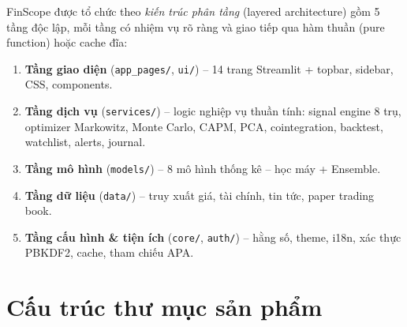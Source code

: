 \documentclass[12pt,a4paper,openany,oneside]{report}
\numberwithin{equation}{chapter}
\begin{document}
\indent FinScope được tổ chức theo \emph{kiến trúc phân tầng} (layered
architecture) gồm 5 tầng độc lập, mỗi tầng có nhiệm vụ rõ ràng và giao
tiếp qua hàm thuần (pure function) hoặc cache đĩa:

\begin{enumerate}[leftmargin=22pt,topsep=2pt,itemsep=4pt]
  \item \textbf{Tầng giao diện} (\texttt{app\_pages/}, \texttt{ui/}) --
   14 trang Streamlit + topbar, sidebar, CSS, components.
  \item \textbf{Tầng dịch vụ} (\texttt{services/}) -- logic nghiệp vụ
   thuần tính: signal engine 8 trụ, optimizer Markowitz, Monte Carlo,
   CAPM, PCA, cointegration, backtest, watchlist, alerts, journal.
  \item \textbf{Tầng mô hình} (\texttt{models/}) -- 8 mô hình thống kê
   -- học máy + Ensemble.
  \item \textbf{Tầng dữ liệu} (\texttt{data/}) -- truy xuất giá, tài
   chính, tin tức, paper trading book.
  \item \textbf{Tầng cấu hình \& tiện ích} (\texttt{core/},
   \texttt{auth/}) -- hằng số, theme, i18n, xác thực PBKDF2, cache,
   tham chiếu APA.
\end{enumerate}

\section{Cấu trúc thư mục sản phẩm}
\end{document}
